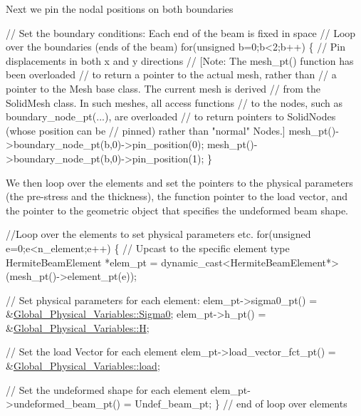 Next we pin the nodal positions on both boundaries


\begin{DoxyCodeInclude}
 \textcolor{comment}{// Set the boundary conditions: Each end of the beam is fixed in space}
 \textcolor{comment}{// Loop over the boundaries (ends of the beam)}
 \textcolor{keywordflow}{for}(\textcolor{keywordtype}{unsigned} b=0;b<2;b++)
  \{
   \textcolor{comment}{// Pin displacements in both x and y directions}
   \textcolor{comment}{// [Note: The mesh\_pt() function has been overloaded}
   \textcolor{comment}{//  to return a pointer to the actual mesh, rather than}
   \textcolor{comment}{//  a pointer to the Mesh base class. The current mesh is derived}
   \textcolor{comment}{//  from the SolidMesh class. In such meshes, all access functions}
   \textcolor{comment}{//  to the nodes, such as boundary\_node\_pt(...), are overloaded}
   \textcolor{comment}{//  to return pointers to SolidNodes (whose position can be}
   \textcolor{comment}{//  pinned) rather than "normal" Nodes.]}
   mesh\_pt()->boundary\_node\_pt(b,0)->pin\_position(0); 
   mesh\_pt()->boundary\_node\_pt(b,0)->pin\_position(1); 
  \}

\end{DoxyCodeInclude}


We then loop over the elements and set the pointers to the physical parameters (the pre-\/stress and the thickness), the function pointer to the load vector, and the pointer to the geometric object that specifies the undeformed beam shape. 
\begin{DoxyCodeInclude}
 \textcolor{comment}{//Loop over the elements to set physical parameters etc.}
 \textcolor{keywordflow}{for}(\textcolor{keywordtype}{unsigned} e=0;e<n\_element;e++)
  \{
   \textcolor{comment}{// Upcast to the specific element type}
   HermiteBeamElement *elem\_pt = 
    \textcolor{keyword}{dynamic\_cast<}HermiteBeamElement*\textcolor{keyword}{>}(mesh\_pt()->element\_pt(e));
   
   \textcolor{comment}{// Set physical parameters for each element:}
   elem\_pt->sigma0\_pt() = &\hyperlink{namespaceGlobal__Physical__Variables_a417dc688a70c4f06ef0faed047068ba2}{Global\_Physical\_Variables::Sigma0};
   elem\_pt->h\_pt() = &\hyperlink{namespaceGlobal__Physical__Variables_af6e07423e22c0991084d9a2f43727805}{Global\_Physical\_Variables::H};

   \textcolor{comment}{// Set the load Vector for each element}
   elem\_pt->load\_vector\_fct\_pt() = &\hyperlink{namespaceGlobal__Physical__Variables_a321267e1efb30b5d586302509354fb07}{Global\_Physical\_Variables::load};

   \textcolor{comment}{// Set the undeformed shape for each element}
   elem\_pt->undeformed\_beam\_pt() = Undef\_beam\_pt;
  \} \textcolor{comment}{// end of loop over elements}

\end{DoxyCodeInclude}


